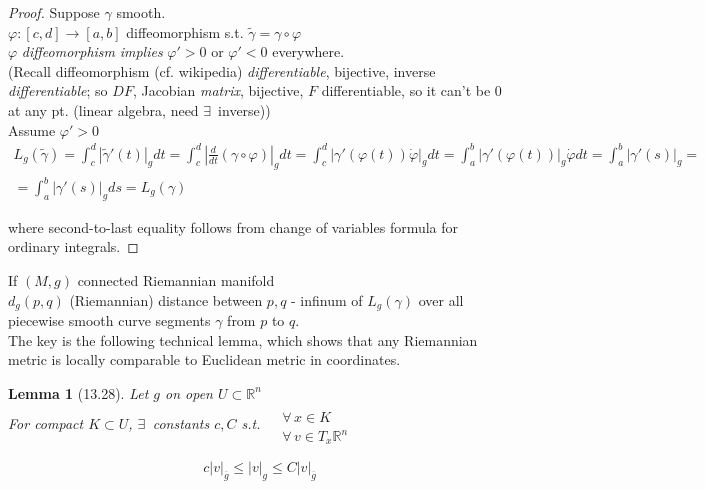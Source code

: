 \documentclass[11pt]{amsart}
\newtheorem{lemma}{Lemma}
\theoremstyle{definition}
\begin{document}
\begin{proof}
  Suppose $\gamma$ smooth. \\
\phantom{Suppose} $\varphi : [c,d] \to [a,b]$ diffeomorphism s.t. $\widetilde{\gamma} = \gamma \circ \varphi$ \\
$\varphi$ \emph{diffeomorphism} \emph{implies} $\varphi' >0$ or $\varphi' <0$ everywhere.   \\

(Recall diffeomorphism (cf. wikipedia) \emph{differentiable}, bijective, inverse \emph{differentiable}; so $DF$, Jacobian \emph{matrix}, bijective,
$F$ differentiable, so it can't be $0$ at any pt. (linear algebra, need $\exists \, $ inverse)) \\

Assume $\varphi' >0$
\[
\begin{gathered}
  L_g(\widetilde{\gamma}) = \int_c^d |\widetilde{\gamma}'(t) |_g dt = \int_c^d \left| \frac{d}{dt} (\gamma \circ \varphi ) \right|_g  dt = \int_c^d | \gamma'(\varphi(t)) \dot{\varphi} |_g dt = \int_a^b |\gamma'(\varphi(t)) |_g \dot{\varphi} dt = \int_a^b |\gamma'(s)|_g = \\
  = \int_a^b |\gamma'(s)|_g ds = L_g(\gamma)
\end{gathered}
\]

where second-to-last equality follows from change of variables formula for ordinary integrals.




\end{proof}


If $(M,g)$ connected Riemannian manifold \\
$d_g(p,q)$ (Riemannian) distance between $p,q$ - infinum of $L_g(\gamma)$ over all piecewise smooth curve segments $\gamma$ from $p$ to $q$.   \\

The key is the following technical lemma, which shows that any Riemannian metric is locally comparable to Euclidean metric in coordinates.

\begin{lemma}[13.28] Let $g$ on open $U\subset \mathbb{R}^n$ \\
For compact $K \subset U$, $\exists \, $ constants $c,C$ s.t. $\begin{aligned} & \quad \\
  & \forall \, x \in K \\
  & \forall \, v\in T_x\mathbb{R}^n \end{aligned}$

\[
c|v|_{\overline{g}} \leq |v|_g \leq C |v|_{\overline{g}}
\]

\end{lemma}
\end{document}
